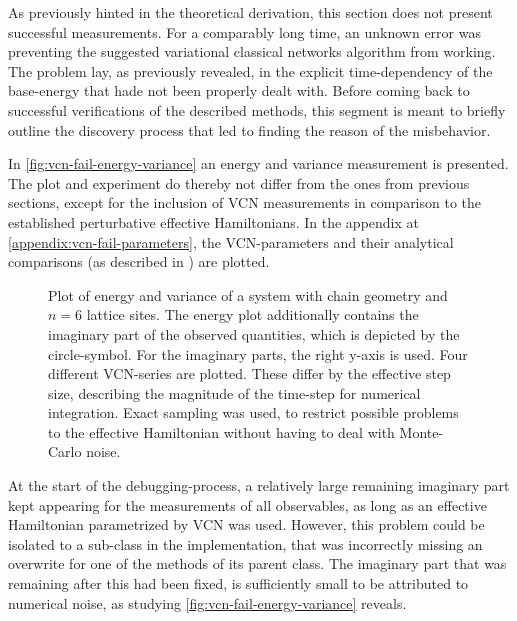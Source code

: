 As previously hinted in the theoretical derivation, this section does not present successful measurements.
For a comparably long time, an unknown error was preventing the suggested variational classical networks algorithm from working.
The problem lay, as previously revealed, in the explicit time-dependency of the base-energy that hade not been properly dealt with.
Before coming back to successful verifications of the described methods, this segment is meant to briefly outline the discovery process that led to finding the reason of the misbehavior.

In \autoref{fig:vcn-fail-energy-variance} an energy and variance measurement is presented. 
The plot and experiment do thereby not differ from the ones from previous sections, except for the inclusion of VCN measurements in comparison to the established perturbative effective Hamiltonians.
In the appendix at \ref{appendix:vcn-fail-parameters}, the VCN-parameters and their analytical comparisons (as described in ) are plotted.

\begin{figure}[htbp]
    \centering
    \vspace{-0.2cm}
    \caption{
            Plot of energy and variance of a system with chain geometry and $n=6$ lattice sites.
            The energy plot additionally contains the imaginary part of the observed quantities, which is depicted by the circle-symbol.
            For the imaginary parts, the right y-axis is used.
            Four different VCN-series are plotted. These differ by the effective step size, describing the magnitude of the time-step for numerical integration.
            Exact sampling was used, to restrict possible problems to the effective Hamiltonian without having to deal with Monte-Carlo noise.
        }
    \label{fig:vcn-fail-energy-variance}
\end{figure}

At the start of the debugging-process, a relatively large remaining imaginary part kept appearing for the measurements of all observables, as long as an effective Hamiltonian parametrized by VCN was used.
However, this problem could be isolated to a sub-class in the implementation, that was incorrectly missing an overwrite for one of the methods of its parent class.
The imaginary part that was remaining after this had been fixed, is sufficiently small to be attributed to numerical noise, as studying \autoref{fig:vcn-fail-energy-variance} reveals.

